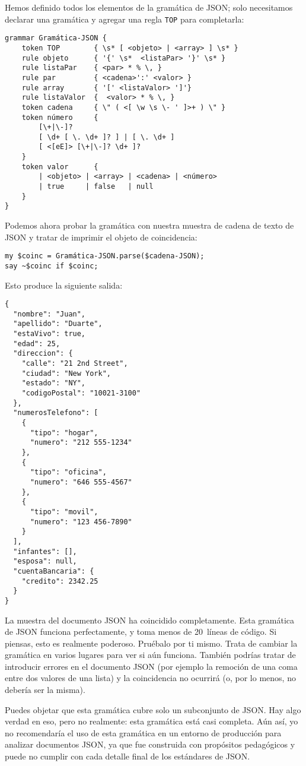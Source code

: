 Hemos definido todos los elementos de la gramática de JSON;
solo necesitamos declarar una gramática y agregar una regla
{\tt TOP} para completarla:

\begin{verbatim}
grammar Gramática-JSON {
	token TOP        { \s* [ <objeto> | <array> ] \s* }
	rule objeto      { '{' \s*  <listaPar> '}' \s* }
	rule listaPar    { <par> * % \, }
	rule par         { <cadena>':' <valor> }
	rule array       { '[' <listaValor> ']'}
	rule listaValor  {  <valor> * % \, }
	token cadena 	 { \" ( <[ \w \s \- ' ]>+ ) \" }
	token número     {
		[\+|\-]?
		[ \d+ [ \. \d+ ]? ] | [ \. \d+ ]
		[ <[eE]> [\+|\-]? \d+ ]?
	}
	token valor      { 
		| <objeto> | <array> | <cadena> | <número> 
		| true     | false   | null 
	}
}
\end{verbatim}

Podemos ahora probar la gramática con nuestra muestra de 
cadena de texto de JSON y tratar de imprimir el objeto de
coincidencia:

\begin{verbatim}
my $coinc = Gramática-JSON.parse($cadena-JSON);
say ~$coinc if $coinc;
\end{verbatim}

Esto produce la siguiente salida:

\begin{verbatim}
{
  "nombre": "Juan",
  "apellido": "Duarte",
  "estaVivo": true,
  "edad": 25,
  "direccion": {
    "calle": "21 2nd Street",
    "ciudad": "New York",
    "estado": "NY",
    "codigoPostal": "10021-3100"
  },
  "numerosTelefono": [
    {
      "tipo": "hogar",
      "numero": "212 555-1234"
    },
    {
      "tipo": "oficina",
      "numero": "646 555-4567"
    },
    {
      "tipo": "movil",
      "numero": "123 456-7890"
    }
  ],
  "infantes": [],
  "esposa": null,  
  "cuentaBancaria": {
    "credito": 2342.25
  }
}
\end{verbatim}

La muestra del documento JSON ha coincidido completamente.
Esta gramática de JSON funciona perfectamente, y toma menos
de 20~líneas de código. Si piensas, esto es realmente poderoso.
Pruébalo por ti mismo. Trata de cambiar la gramática en varios
lugares para ver si aún funciona. También podrías tratar
de introducir errores en el documento JSON (por ejemplo la remoción
de una coma entre dos valores de una lista) y la coincidencia
no ocurrirá (o, por lo menos, no debería ser la misma).

Puedes objetar que esta gramática cubre solo un subconjunto de JSON.
Hay algo verdad en eso, pero no realmente: esta gramática está casi 
completa. Aún así, yo no recomendaría el uso de esta gramática
en un entorno de producción para analizar documentos JSON,
ya que fue construida con propósitos pedagógicos y puede no cumplir
con cada detalle final de los estándares de JSON.

